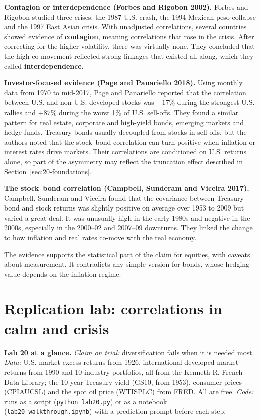 \textbf{Contagion or interdependence (Forbes and Rigobon 2002).} Forbes and Rigobon studied three crises: the 1987 U.S. crash, the 1994 Mexican peso collapse and the 1997 East Asian crisis. With unadjusted correlations, several countries showed evidence of \textbf{contagion}, meaning correlations that rose in the crisis. After correcting for the higher volatility, there was virtually none. They concluded that the high co-movement reflected strong linkages that existed all along, which they called \textbf{interdependence}.

\textbf{Investor-focused evidence (Page and Panariello 2018).} Using monthly data from 1970 to mid-2017, Page and Panariello reported that the correlation between U.S. and non-U.S. developed stocks was $-17\%$ during the strongest U.S. rallies and $+87\%$ during the worst 1\% of U.S. sell-offs. They found a similar pattern for real estate, corporate and high-yield bonds, emerging markets and hedge funds. Treasury bonds usually decoupled from stocks in sell-offs, but the authors noted that the stock--bond correlation can turn positive when inflation or interest rates drive markets. Their correlations are conditioned on U.S. returns alone, so part of the asymmetry may reflect the truncation effect described in Section~\ref{sec:20-foundations}.

\textbf{The stock--bond correlation (Campbell, Sunderam and Viceira 2017).} Campbell, Sunderam and Viceira found that the covariance between Treasury bond and stock returns was slightly positive on average over 1953 to 2009 but varied a great deal. It was unusually high in the early 1980s and negative in the 2000s, especially in the 2000--02 and 2007--09 downturns. They linked the change to how inflation and real rates co-move with the real economy.

The evidence supports the statistical part of the claim for equities, with caveats about measurement. It contradicts any simple version for bonds, whose hedging value depends on the inflation regime.

\section{Replication lab: correlations in calm and crisis}
\label{sec:20-lab}

\begin{callout}
\textbf{Lab 20 at a glance.} \emph{Claim on trial:} diversification fails when it is needed most. \emph{Data:} U.S. market excess returns from 1926, international developed-market returns from 1990 and 10 industry portfolios, all from the Kenneth R. French Data Library; the 10-year Treasury yield (GS10, from 1953), consumer prices (CPIAUCSL) and the spot oil price (WTISPLC) from FRED. All are free. \emph{Code:} runs as a script (\texttt{python lab20.py}) or as a notebook (\texttt{lab20\_walkthrough.ipynb}) with a prediction prompt before each step.
\end{callout}

